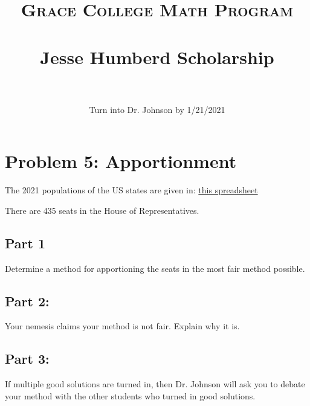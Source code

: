 \documentclass[paper=a4, fontsize=16pt]{scrartcl} %
\title{	
\normalfont \normalsize 
\textsc{Grace College Math Program} \\ [0pt] %
\horrule{0.5pt} \\[0.4cm] %
\huge Jesse Humberd Scholarship\\ %
\horrule{2pt} \\[0.5cm] %
}
\date{\normalsize Turn into Dr. Johnson by 1/21/2021} %
\numberwithin{equation}{section} %
\numberwithin{figure}{section} %
\numberwithin{table}{section} %
\begin{document}
\maketitle %


\section*{Problem 5: Apportionment}

The 2021 populations of the US states are given in: \href{https://docs.google.com/spreadsheets/d/1vNsJUCeAJQmlQO-3LRSJVSzx3d8YHnuZi-XCvZfDue4/edit?usp=sharing}{this spreadsheet}

There are 435 seats in the House of Representatives.

\subsection*{Part 1}
Determine a method for apportioning the seats in the most fair method possible.

\subsection*{Part 2:}
Your nemesis claims your method is not fair.  Explain why it is.

\subsection*{Part 3:}
If multiple good solutions are turned in, then Dr. Johnson will ask you to debate your method with the other students who turned in good solutions.


\end{document}
